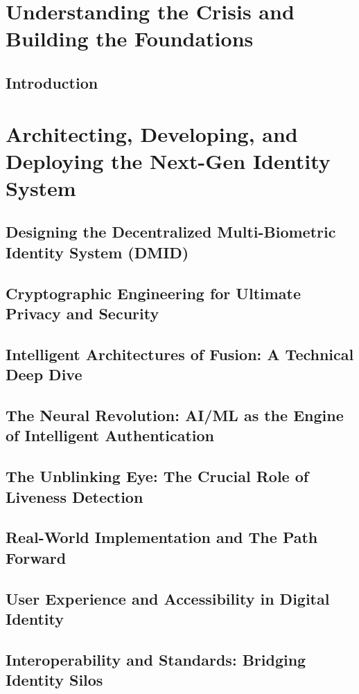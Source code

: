 \documentclass[12pt,a4paper,twoside,openright]{book}
\begin{document}
\setcounter{page}{1}

\part{Understanding the Crisis and Building the Foundations}
\chapter{Introduction}






\part{Architecting, Developing, and Deploying the Next-Gen Identity System}
\chapter{Designing the Decentralized Multi-Biometric Identity System (DMID)}
\chapter{Cryptographic Engineering for Ultimate Privacy and Security}
\chapter{Intelligent Architectures of Fusion: A Technical Deep Dive}
\chapter{The Neural Revolution: AI/ML as the Engine of Intelligent Authentication}
\chapter{The Unblinking Eye: The Crucial Role of Liveness Detection}
\chapter{Real-World Implementation and The Path Forward}
\chapter{User Experience and Accessibility in Digital Identity}
\chapter{Interoperability and Standards: Bridging Identity Silos}
\end{document}
